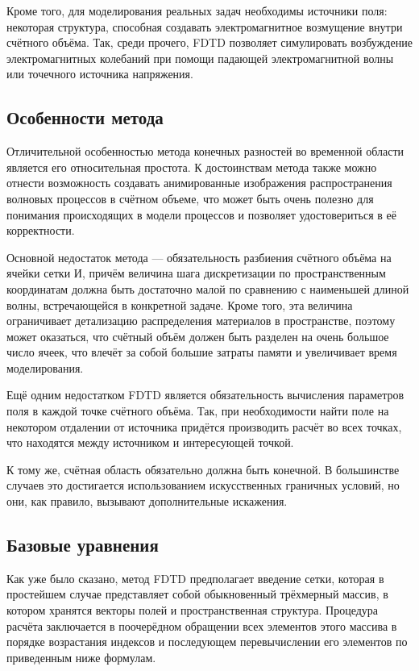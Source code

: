 Кроме того, для моделирования реальных задач необходимы источники поля: некоторая структура, способная создавать электромагнитное возмущение внутри счётного объёма. Так, среди прочего, FDTD позволяет симулировать возбуждение электромагнитных колебаний при помощи падающей электромагнитной волны или точечного источника напряжения.

\subsection{Особенности метода}

Отличительной особенностью метода конечных разностей во временной области является его относительная простота. К достоинствам метода также можно отнести возможность создавать анимированные изображения распространения волновых процессов в счётном объеме, что может быть очень полезно для понимания происходящих в модели процессов и позволяет удостовериться в её корректности.

Основной недостаток метода --- обязательность разбиения счётного объёма на ячейки сетки И, причём величина шага дискретизации по пространственным координатам должна быть достаточно малой по сравнению с наименьшей длиной волны, встречающейся в конкретной задаче. Кроме того, эта величина ограничивает детализацию распределения материалов в пространстве, поэтому может оказаться, что счётный объём должен быть разделен на очень большое число ячеек, что влечёт за собой большие затраты памяти и увеличивает время моделирования.

Ещё одним недостатком FDTD является обязательность вычисления параметров поля в каждой точке счётного объёма. Так, при необходимости найти поле на некотором отдалении от источника придётся производить расчёт во всех точках, что находятся между источником и интересующей точкой.

К тому же, счётная область обязательно должна быть конечной. В большинстве случаев это достигается использованием искусственных граничных условий, но они, как правило, вызывают дополнительные искажения.

\subsection{Базовые уравнения}

Как уже было сказано, метод FDTD предполагает введение сетки, которая в простейшем случае представляет собой обыкновенный трёхмерный массив, в котором хранятся векторы полей и пространственная структура. Процедура расчёта заключается в поочерёдном обращении всех элементов этого массива в порядке возрастания индексов и последующем перевычислении его элементов по приведенным ниже формулам.

